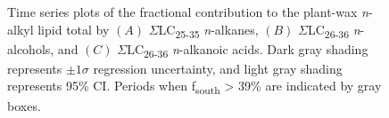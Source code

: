 \begin{figure}[p]
	\caption[Time-series plots of compound-class contribution]{Time series plots of the fractional contribution to the plant-wax \textit{n}-alkyl lipid total by $(A)$ $\Sigma$LC\textsubscript{25-35} \textit{n}-alkanes, $(B)$ $\Sigma$LC\textsubscript{26-36} \textit{n}-alcohols, and $(C)$ $\Sigma$LC\textsubscript{26-36} \textit{n}-alkanoic acids. Dark gray shading represents $\pm 1 \sigma$ regression uncertainty, and light gray shading represents 95\% CI. Periods when f\textsubscript{south} > 39\% are indicated by gray boxes.}
	\label{Ch4Fig:9} 
\end{figure}

